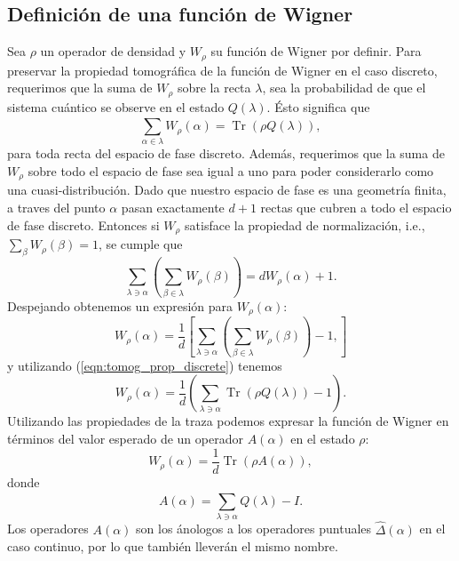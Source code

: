 \documentclass[a4paper,11pt]{report}
\DeclareMathOperator{\Tr}{Tr}
\begin{document}
  \subsection{Definición de una función de Wigner}

  Sea $\rho$ un operador de densidad y $W_\rho$ su función
  de Wigner por definir. Para preservar la propiedad
  tomográfica de la función de Wigner en el caso discreto,
  requerimos que la suma de $W_\rho$ sobre la recta
  $\lambda$, sea la probabilidad de que el sistema cuántico
  se observe en el estado $Q(\lambda)$. Ésto significa que 
  \begin{equation}
    \label{eqn:tomog_prop_discrete}
    \sum_{\alpha \in \lambda}^{} W_\rho(\alpha)
    = \Tr\left( \rho Q(\lambda) \right),
  \end{equation}
  para toda recta del espacio de fase discreto. Además,
  requerimos que la suma de $W_\rho$ sobre todo el espacio
  de fase sea igual a uno para poder considerarlo como una
  cuasi-distribución. Dado que nuestro espacio de fase es
  una geometría finita, a traves del punto $\alpha$ pasan
  exactamente $d+1$ rectas que cubren a todo el espacio de
  fase discreto.  Entonces si $W_\rho$ satisface la
  propiedad de normalización, i.e., $\sum_\beta
  W_\rho(\beta) = 1$, se cumple que
  \begin{equation}
    \sum_{\lambda \ni \alpha}^{}
    \left( \sum_{\beta \in \lambda}^{} W_\rho(\beta) \right) 
    = d W_\rho(\alpha) + 1.
  \end{equation}
  Despejando obtenemos un expresión para $W_\rho(\alpha)$:
  \[
    W_\rho(\alpha)
    = \frac{1}{d}
    \left[
      \sum_{\lambda \ni \alpha}^{}
      \left(
        \sum_{\beta \in \lambda}^{} W_\rho(\beta)
      \right) - 1,
    \right]
  \] 
  y utilizando (\ref{eqn:tomog_prop_discrete}) tenemos
  \begin{equation}
    W_\rho(\alpha)
    = \frac{1}{d} \left( \sum_{\lambda \ni \alpha}^{}
    \Tr\left( \rho Q(\lambda) \right) - 1 \right).
  \end{equation}
  Utilizando las propiedades de la traza podemos expresar
  la función de Wigner en términos del valor esperado de un
  operador $A(\alpha)$ en el estado $\rho$:
  \begin{equation}
    \label{eqn:discrete_wigner}
    W_\rho(\alpha)
    = \frac{1}{d} \Tr\left( \rho A(\alpha) \right),
  \end{equation} 
  donde 
  \begin{equation}
    \label{eqn:discrete_point_op}
    A(\alpha)
    = \sum_{\lambda \ni \alpha}^{} Q(\lambda) - I.
  \end{equation} 
  Los operadores $A(\alpha)$ son los ánologos a los
  operadores puntuales $\hat \Delta(\alpha)$ en el caso
  continuo, por lo que también lleverán el mismo nombre.
\end{document}
